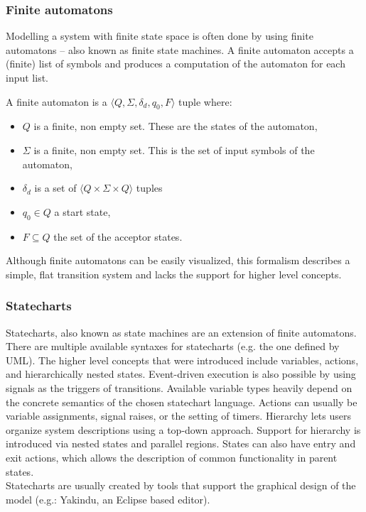     \subsubsection{Finite automatons}
Modelling a system with finite state space is often done by using finite automatons -- also known as finite state machines. A finite automaton accepts a (finite) list of symbols and produces a computation of the automaton for each input list.
      \begin{dfn}
        \label{dfn:fa}
A finite automaton is a $\langle Q,\Sigma,\delta_d,q_0, F \rangle$ tuple where:
        \begin{itemize}
          \item $Q$ is a finite, non empty set. These are the states of the automaton,
          \item $\Sigma$ is a finite, non empty set. This is the set of input symbols of the automaton,
          \item $\delta_d$ is a set of $\langle Q \times \Sigma \times Q \rangle$ tuples
          \item $q_0 \in Q$ a start state,
          \item $F \subseteq Q$ the set of the acceptor states.
        \end{itemize}
      \end{dfn}
Although finite automatons can be easily visualized, this formalism describes a simple, flat transition system and lacks the support for higher level concepts.
    \subsubsection{Statecharts}
Statecharts, also known as state machines are an extension of finite automatons. There are multiple available syntaxes for statecharts (e.g. the one defined by UML). The higher level concepts that were introduced include variables, actions, and hierarchically nested states. Event-driven execution is also possible by using signals as the triggers of transitions. Available variable types heavily depend on the concrete semantics of the chosen statechart language. Actions can usually be variable assignments, signal raises, or the setting of timers. Hierarchy lets users organize system descriptions using a top-down approach. Support for hierarchy is introduced via nested states and parallel regions. States can also have entry and exit actions, which allows the description of common functionality in parent states.\\
Statecharts are usually created by tools that support the graphical design of the model (e.g.: Yakindu, an Eclipse based editor).
